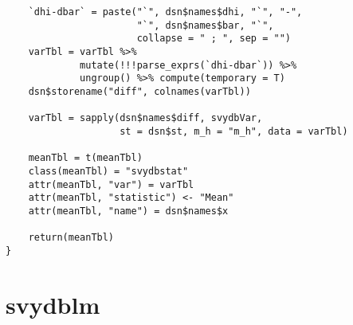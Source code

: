 \begin{lstlisting}
    `dhi-dbar` = paste("`", dsn$names$dhi, "`", "-", 
                       "`", dsn$names$bar, "`", 
                       collapse = " ; ", sep = "")
    varTbl = varTbl %>% 
             mutate(!!!parse_exprs(`dhi-dbar`)) %>% 
             ungroup() %>% compute(temporary = T)
    dsn$storename("diff", colnames(varTbl))

    varTbl = sapply(dsn$names$diff, svydbVar, 
                    st = dsn$st, m_h = "m_h", data = varTbl)

    meanTbl = t(meanTbl)
    class(meanTbl) = "svydbstat"
    attr(meanTbl, "var") = varTbl
    attr(meanTbl, "statistic") <- "Mean"
    attr(meanTbl, "name") = dsn$names$x

    return(meanTbl)
}

\end{lstlisting}

\section{svydblm}

